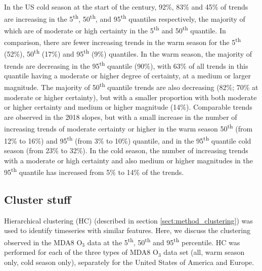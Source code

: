 \documentclass[journal abbreviation, manuscript]{copernicus}
\begin{document}
In the US cold season at the start of the century, 92\%, 83\% and 45\% of trends are increasing in the 5\textsuperscript{th}, 50\textsuperscript{th}, and 95\textsuperscript{th} quantiles respectively, the majority of which are of moderate or high certainty in the 5\textsuperscript{th} and 50\textsuperscript{th} quantile. In comparison, there are fewer increasing trends in the warm season for the 5\textsuperscript{th} (52\%), 50\textsuperscript{th} (17\%) and 95\textsuperscript{th} (9\%) quantiles. In the warm season, the majority of trends are decreasing in the 95\textsuperscript{th} quantile (90\%), with 63\% of all trends in this quantile having a moderate or higher degree of certainty, at a medium or larger magnitude. The majority of 50\textsuperscript{th} quantile trends are also decreasing (82\%; 70\% at moderate or higher certainty), but with a smaller proportion with both moderate or higher certainty and medium or higher magnitude (14\%). Comparable trends are observed in the 2018 slopes, but with a small increase in the number of increasing trends of moderate certainty or higher in the warm season 50\textsuperscript{th} (from 12\% to 16\%) and 95\textsuperscript{th} (from 3\% to 10\%) quantile, and in the 95\textsuperscript{th} quantile cold season (from 23\% to 32\%). In the cold season, the number of increasing trends with a moderate or high certainty and also medium or higher magnitudes in the 95\textsuperscript{th} quantile has increased from 5\% to 14\% of the trends.


\subsection{Cluster stuff} \label{sect:cluster_stuff}
Hierarchical clustering (HC) (described in section \ref{sect:method_clustering}) was used to identify timeseries with similar features. Here, we discuss the clustering observed in the MDA8 O$_3$ data at the 5\textsuperscript{th}, 50\textsuperscript{th} and 95\textsuperscript{th} percentile. HC was performed for each of the three types of MDA8 O$_3$ data set (all, warm season only, cold season only), separately for the United States of America and Europe. 
\end{document}
